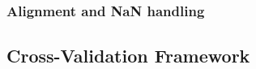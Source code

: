 \documentclass[12pt,a4paper,oneside]{article}
\begin{document}


\subsubsection{Alignment and NaN handling}\label{subsubsec:alignment}

%
%
%
%
%
%
%


\subsection{Cross-Validation Framework}\label{subsec:cpcv}
\end{document}
